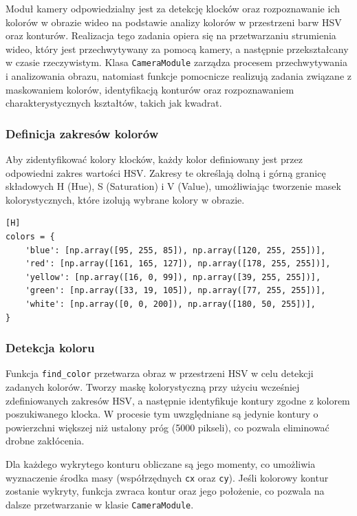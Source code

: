 Moduł kamery odpowiedzialny jest za detekcję klocków oraz rozpoznawanie ich kolorów w obrazie wideo na podstawie analizy kolorów w przestrzeni barw HSV oraz konturów. Realizacja tego zadania opiera się na przetwarzaniu strumienia wideo, który jest przechwytywany za pomocą kamery, a następnie przekształcany w czasie rzeczywistym. Klasa \texttt{CameraModule} zarządza procesem przechwytywania i analizowania obrazu, natomiast funkcje pomocnicze realizują zadania związane z maskowaniem kolorów, identyfikacją konturów oraz rozpoznawaniem charakterystycznych kształtów, takich jak kwadrat.

\subsubsection{Definicja zakresów kolorów}

Aby zidentyfikować kolory klocków, każdy kolor definiowany jest przez odpowiedni zakres wartości HSV. Zakresy te określają dolną i górną granicę składowych H (Hue), S (Saturation) i V (Value), umożliwiając tworzenie masek kolorystycznych, które izolują wybrane kolory w obrazie.

\vspace*{0.5cm}


\begin{lstlisting}[caption=Definicje zakresów kolorów dla identyfikacji klocków, label=fig:color_definitions, captionpos=b][H]
colors = {
    'blue': [np.array([95, 255, 85]), np.array([120, 255, 255])],
    'red': [np.array([161, 165, 127]), np.array([178, 255, 255])],
    'yellow': [np.array([16, 0, 99]), np.array([39, 255, 255])],
    'green': [np.array([33, 19, 105]), np.array([77, 255, 255])],
    'white': [np.array([0, 0, 200]), np.array([180, 50, 255])],
}
\end{lstlisting}


\subsubsection{Detekcja koloru}

Funkcja \texttt{find\_color} przetwarza obraz w przestrzeni HSV w celu detekcji zadanych kolorów. Tworzy maskę kolorystyczną przy użyciu wcześniej zdefiniowanych zakresów HSV, a następnie identyfikuje kontury zgodne z kolorem poszukiwanego klocka. W procesie tym uwzględniane są jedynie kontury o powierzchni większej niż ustalony próg (5000 pikseli), co pozwala eliminować drobne zakłócenia.

Dla każdego wykrytego konturu obliczane są jego momenty, co umożliwia wyznaczenie środka masy (współrzędnych \texttt{cx} oraz \texttt{cy}). Jeśli kolorowy kontur zostanie wykryty, funkcja zwraca kontur oraz jego położenie, co pozwala na dalsze przetwarzanie w klasie \texttt{CameraModule}.

